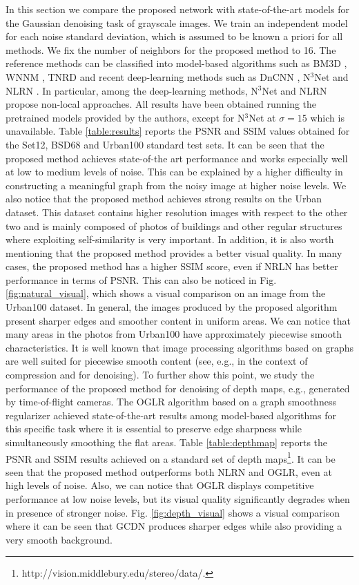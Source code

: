 \documentclass[journal]{IEEEtran}
\begin{document}
In this section we compare the proposed network with state-of-the-art models for the Gaussian denoising task of grayscale images. We train an independent model for each noise standard deviation, which is assumed to be known a priori for all methods. We fix the number of neighbors for the proposed method to 16. The reference methods can be classified into model-based algorithms such as BM3D \cite{dabov2007image}, WNNM \cite{gu2014weighted}, TNRD \cite{chen2016trainable} and recent deep-learning methods such as DnCNN \cite{zhang2017beyond}, N$^3$Net \cite{plotz2018neural} and NLRN \cite{liu2018non}. In particular, among the deep-learning methods, N$^3$Net and NLRN propose non-local approaches. All results have been obtained running the pretrained models provided by the authors, except for N$^3$Net at $\sigma=15$ which is unavailable. Table \ref{table:results} reports the PSNR and SSIM values obtained for the Set12, BSD68 and Urban100 standard test sets. It can be seen that the proposed method achieves state-of-the art performance and works especially well at low to medium levels of noise. This can be explained by a higher difficulty in constructing a meaningful graph from the noisy image at higher noise levels. We also notice that the proposed method achieves strong results on the Urban dataset. This dataset contains higher resolution images with respect to the other two and is mainly composed of photos of buildings and other regular structures where exploiting self-similarity is very important. In addition, it is also worth mentioning that the proposed method provides a better visual quality. In many cases, the proposed method has a higher SSIM score, even if NRLN has better performance in terms of PSNR. This can also be noticed in Fig. \ref{fig:natural_visual}, which shows a visual comparison on an image from the Urban100 dataset. In general, the images produced by the proposed algorithm present sharper edges and smoother content in uniform areas.
We can notice that many areas in the photos from Urban100 have approximately piecewise smooth characteristics. It is well known that image processing algorithms based on graphs are well suited for piecewise smooth content (see, e.g., \cite{Hu2015multiresolution,Fracastoro2017graph} in the context of compression and \cite{pang2017graph} for denoising). To further show this point, we study the performance of the proposed method for denoising of depth maps, e.g., generated by time-of-flight cameras. The OGLR algorithm \cite{pang2017graph} based on a graph smoothness regularizer achieved state-of-the-art results among model-based algorithms for this specific task where it is essential to preserve edge sharpness while simultaneously smoothing the flat areas. Table \ref{table:depthmap} reports the PSNR and SSIM results achieved on a standard set of depth maps\footnote{http://vision.middlebury.edu/stereo/data/.}. It can be seen that the proposed method outperforms both NLRN and OGLR, even at high levels of noise. Also, we can notice that OGLR displays competitive performance at low noise levels, but its visual quality significantly degrades when in presence of stronger noise. Fig. \ref{fig:depth_visual} shows a visual comparison where it can be seen that GCDN produces sharper edges while also providing a very smooth background.
\end{document}

